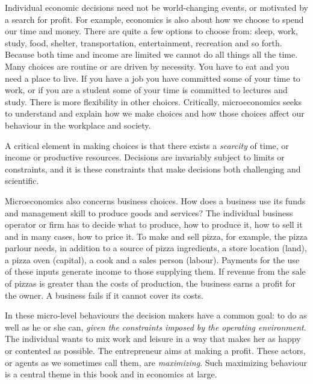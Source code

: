 Individual economic decisions need not be world-changing events, or motivated by a search for profit. For example, economics is also about how we choose to spend our time and money. There are quite a few options to choose from: sleep, work, study, food, shelter, transportation, entertainment, recreation and so forth. Because both time and income are limited we cannot do all things all the time. Many choices are routine or are driven by necessity. You have to eat and you need a place to live. If you have a job you have committed some of your time to work, or if you are a student some of your time is committed to lectures and study. There is more flexibility in other choices. Critically, microeconomics seeks to understand and explain how we make choices and how those choices affect our behaviour in the workplace and society. 

A critical element in making choices is that there exists a \textit{scarcity} of time, or income or productive resources. Decisions are invariably subject to limits or constraints, and it is these constraints that make decisions both challenging and scientific.  

Microeconomics also concerns business choices. How does a business use its funds and management skill to produce goods and services?  The individual business operator or firm has to decide what to produce, how to produce it, how to sell it and in many cases, how to price it. To make and sell pizza, for example, the pizza parlour needs, in addition to a source of pizza ingredients, a store location (land), a pizza oven (capital), a cook and a sales person (labour). Payments for the use of these inputs generate income to those supplying them. If revenue from the sale of pizzas is greater than the costs of production, the business earns a profit for the owner. A business fails if it cannot cover its costs.

In these micro-level behaviours the decision makers have a common goal: to do as well as he or she can, \textit{given the constraints imposed by the operating environment}. The individual wants to mix work and leisure in a way that makes her as happy or contented as possible. The entrepreneur aims at making a profit. These actors, or agents as we sometimes call them, are \textit{maximizing}. Such maximizing behaviour is a central theme in this book and in economics at large.

